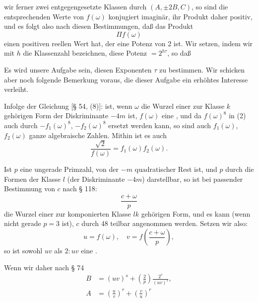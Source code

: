 wir ferner zwei entgegengesetzte Klassen durch $(A, \pm 2B, C)$, so sind
die entsprechenden Werte von $f(\omega)$ konjugiert imaginär, ihr Produkt
daher positiv, und es folgt also nach diesen Bestimmungen, daß das
Produkt
\[
\Pi f(\omega)
\]
einen positiven reellen Wert hat, der eine Potenz von 2 ist. Wir setzen,
indem wir mit $h$ die Klassenzahl bezeichnen, diese Potenz $= 2^{h\tau}$,
so daß

Es wird unsere Aufgabe sein, diesen Exponenten $\tau$ zu bestimmen. Wir
schicken aber noch folgende Bemerkung voraus, die dieser Aufgabe ein
erhöhtes Interesse verleiht.

Infolge der Gleichung [§ 54, (8)]:
ist, wenn $\omega$ die Wurzel einer zur Klasse $k$ gehörigen Form der
Diskriminante $-4m$ ist, $f(\omega)$ eine , und da
$f(\omega)^8$ in (2) auch durch $-f_1(\omega)^8$, $-f_2(\omega)^8$ ersetzt
werden kann, so sind auch $f_1(\omega)$, $f_2(\omega)$ ganze algebraische
Zahlen. Mithin ist es auch
\[
\frac{\sqrt{2}}{f(\omega)} = f_1(\omega) f_2(\omega).
\]

Ist $p$ eine ungerade Primzahl, von der $-m$ quadratischer Rest ist, und
$p$ durch die Formen der Klasse $l$ (der Diskriminante $-4m$) darstellbar,
so ist bei passender Bestimmung von $c$ nach § 118:
\[
\frac{c+\omega}{p}
\]
die Wurzel einer zur komponierten Klasse $lk$ gehörigen Form, und es kann
(wenn nicht gerade $p=3$ ist), $c$ durch 48 teilbar angenommen werden.
Setzen wir also:
\[
u = f(\omega), \quad v = f\left(\frac{c+\omega}{p}\right),
\]
so ist sowohl $uv$ als $2:uv$ eine .

Wenn wir daher nach § 74
\[
\begin{aligned}
B &= (uv)^s + \left(\frac{2}{p}\right)\frac{2^s}{(uv)^s},\\
A &= \left(\frac{u}{v}\right)^r + \left(\frac{v}{u}\right)^r
\end{aligned}
\]
